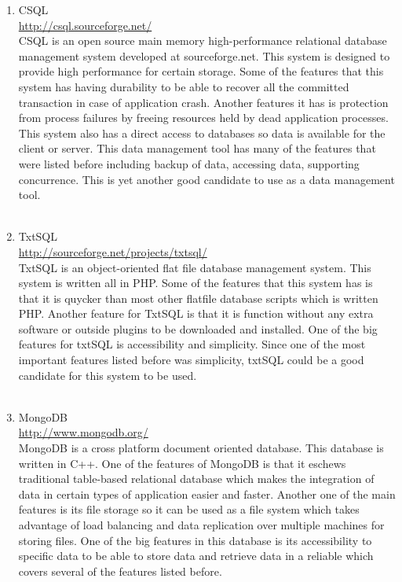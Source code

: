 \documentclass{article}
\begin{document}
\begin{enumerate}
\\
\\
\item CSQL
\\
\url{http://csql.sourceforge.net/}
\\
CSQL is an open source main memory high-performance relational database management system developed at sourceforge.net. This system is designed to provide high performance for certain storage. Some of the features that this system has having durability to be able to recover all the committed transaction in case of application crash. Another features it has is protection from process failures by freeing resources held by dead application processes. This system also has a direct access to databases so data is available for the client or server. This data management tool has many of the features that were listed before including backup of data, accessing data, supporting concurrence. This is yet another good candidate to use as a data management tool. 
\\
\\
\item TxtSQL
\\
\url{http://sourceforge.net/projects/txtsql/}
\\
TxtSQL is an object-oriented flat file database management system. This system is written all in PHP. Some of the features that this system has is that it is quycker than most other flatfile database scripts which is written PHP. Another feature for TxtSQL is that it is function without any extra software or outside plugins to be downloaded and installed. One of the big features for txtSQL is accessibility and simplicity. Since one of the most important features listed before was simplicity, txtSQL could be a good candidate for this system to be used.  
\\
\\
\item MongoDB
\\
\url{http://www.mongodb.org/}
\\
MongoDB is a cross platform document oriented database. This database is written in C++. One of the features of MongoDB is that it eschews traditional table-based relational database which makes the integration of data in certain types of application easier and faster. Another one of the main features is its file storage so it can be used as a file system which takes advantage of load balancing and data replication over multiple machines for storing files. One of the big features in this database is its accessibility to specific data to be able to store data and retrieve data in a reliable which covers several of the features listed before.   

\end{enumerate}
\end{document}
